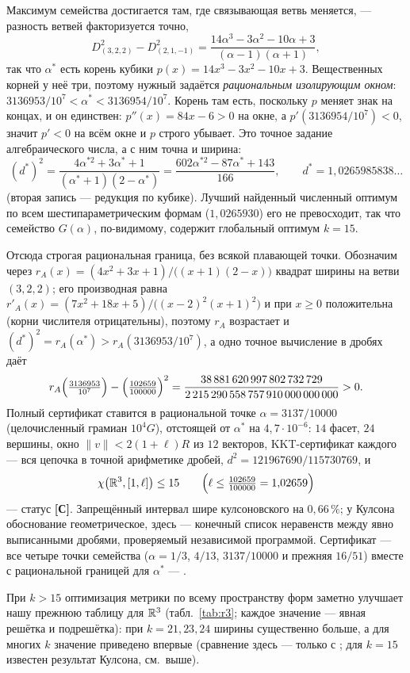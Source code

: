 Максимум семейства достигается там, где связывающая ветвь меняется, ---
разность ветвей факторизуется точно,
\[
D^2_{(3,2,2)}-D^2_{(2,1,-1)}
=\frac{14\alpha^3-3\alpha^2-10\alpha+3}{(\alpha-1)(\alpha+1)},
\]
так что $\alpha^*$ есть корень кубики $p(x)=14x^3-3x^2-10x+3$. Вещественных
корней у неё три, поэтому нужный задаётся \emph{рациональным изолирующим
окном}: $3136953/10^7<\alpha^*<3136954/10^7$. Корень там есть, поскольку
$p$ меняет знак на концах, и он единствен: $p''(x)=84x-6>0$ на окне, а
$p'(3136954/10^7)<0$, значит $p'<0$ на всём окне и $p$ строго убывает. Это
точное задание алгебраического числа, а с ним точна и ширина:
\[
(d^*)^2=\frac{4\alpha^{*2}+3\alpha^*+1}{(\alpha^*+1)(2-\alpha^*)}
=\frac{602\alpha^{*2}-87\alpha^*+143}{166},
\qquad d^*=1{,}0265985838\ldots
\]
(вторая запись --- редукция по кубике). Лучший найденный численный оптимум по
всем шестипараметрическим формам ($1{,}0265930$) его не превосходит, так что
семейство $G(\alpha)$, по-видимому, содержит глобальный оптимум $k=15$.

Отсюда строгая рациональная граница, без всякой плавающей точки. Обозначим
через $r_A(x)=(4x^2+3x+1)/\bigl((x+1)(2-x)\bigr)$ квадрат ширины на ветви
$(3,2,2)$; его производная равна
$r'_A(x)=(7x^2+18x+5)/\bigl((x-2)^2(x+1)^2\bigr)$ и при $x\ge0$ положительна
(корни числителя отрицательны), поэтому $r_A$ возрастает и
$(d^*)^2=r_A(\alpha^*)>r_A(3136953/10^7)$, а одно точное вычисление в дробях
даёт
\[
r_A\Bigl(\tfrac{3136953}{10^7}\Bigr)-\Bigl(\tfrac{102659}{100000}\Bigr)^2
=\frac{38\,881\,620\,997\,802\,732\,729}
{2\,215\,290\,558\,757\,910\,000\,000\,000}>0 .
\]
Полный сертификат ставится в рациональной точке $\alpha=3137/10000$
(целочисленный грамиан $10^4G$), отстоящей от $\alpha^*$ на
$4{,}7\cdot10^{-6}$: $14$ фасет, $24$ вершины, окно $\|v\|<2(1+\ell)R$ из
$12$ векторов, KKT-сертификат каждого --- вся цепочка в точной арифметике
дробей, $d^2=121967690/115730769$, и
\[
\chi\bigl(\mathbb{R}^3,[1,\ell]\bigr)\le15\qquad
\Bigl(\ell\le\tfrac{102659}{100000}=1{,}02659\Bigr)
\]
--- статус \textbf{[С]}. Запрещённый интервал шире кулсоновского на
$0{,}66\,\%$; у Кулсона обоснование геометрическое, здесь --- конечный список
неравенств между явно выписанными дробями, проверяемый независимой
программой. Сертификат --- все четыре точки семейства ($\alpha=1/3$, $4/13$,
$3137/10000$ и прежняя $16/51$) вместе с рациональной границей для
$\alpha^*$ --- .

При $k>15$ оптимизация метрики по всему пространству форм заметно улучшает
нашу прежнюю таблицу \cite{Ivanov2011} для $\mathbb{R}^3$ (табл.~\ref{tab:r3}; каждое значение
--- явная решётка и подрешётка): при $k=21,23,24$ ширины существенно больше, а
для многих $k$ значение приведено впервые (сравнение здесь --- только
с \cite{Ivanov2011}; для $k=15$ известен результат Кулсона, см.\ выше).

